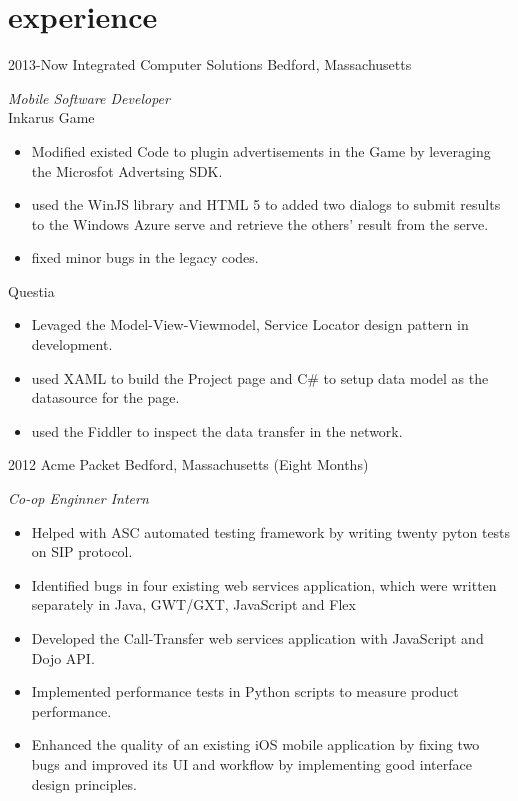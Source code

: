 \documentclass[]{ly-cv} %
\begin{document}
\section{experience}
\begin{entrylist}
\entry
{2013-Now}
{Integrated Computer Solutions}
{Bedford, Massachusetts}
{\emph{Mobile Software Developer}\\
Inkarus Game
\begin{itemize}
  \item Modified existed Code to plugin advertisements in the Game by leveraging the Microsfot Advertsing SDK.
  \item used the WinJS library and HTML 5 to added two dialogs to submit results to the Windows Azure serve and retrieve the others' result from the serve.
  \item fixed minor bugs in the legacy codes.
\end{itemize}
Questia
\begin{itemize}
  \item Levaged the Model-View-Viewmodel, Service Locator design pattern in development.
  \item used XAML to build the Project page and C\# to setup data model as the datasource for the page.
  \item used the Fiddler to inspect the data transfer in the network.
\end{itemize}}
\entry
{2012}
{Acme Packet}
{Bedford, Massachusetts \small{(Eight Months)}}
{\emph{Co-op Enginner Intern}
\begin{itemize}
  \item Helped with ASC automated testing framework by writing twenty pyton tests on SIP protocol.
	\item Identified bugs in four existing web services application, which were written separately in Java, GWT/GXT, JavaScript and Flex
  \item Developed the Call-Transfer web services application with JavaScript and Dojo API.
	\item Implemented performance tests in Python scripts to measure product performance.
  \item Enhanced the quality of an existing iOS mobile application by fixing two bugs and improved its UI and workflow by implementing good interface design principles.
\end{itemize}}

\end{entrylist}
\end{document}
